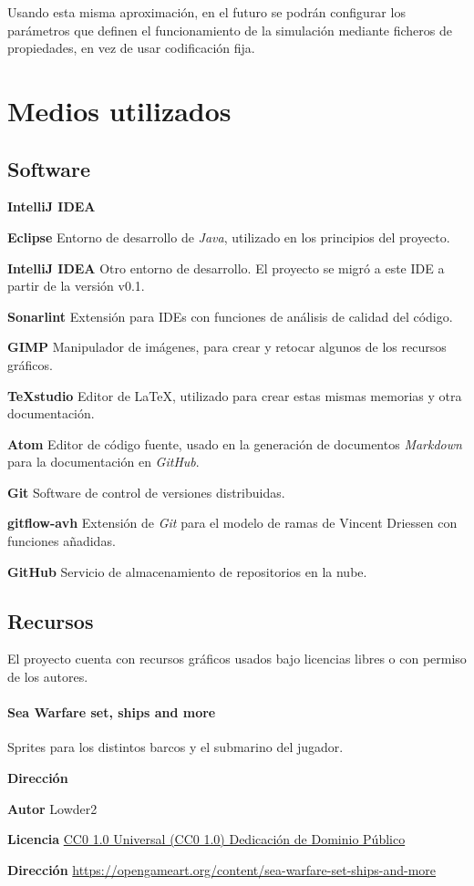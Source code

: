 \documentclass[a4paper,
	11pt,
	parskip=full,
	bibliography=totoc,
	twoside
	]{scrartcl}
\let\oldsection\section
\def\section{\cleardoubleoddpage\oldsection}
\begin{document}
		Usando esta misma aproximación, en el futuro se podrán configurar los parámetros que definen el funcionamiento de la simulación mediante ficheros de propiedades, en vez de usar codificación fija.
	
\section{Medios utilizados}
\label{sec:medios}
	\subsection{Software}
	\begin{labeling}{\textbf{IntelliJ IDEA}}
		\item[\textbf{Eclipse}] Entorno de desarrollo de \textit{Java}, utilizado en los principios del proyecto.
		\item[\textbf{IntelliJ IDEA}] Otro entorno de desarrollo. El proyecto se migró a este IDE a partir de la versión v0.1.
		\item[\textbf{Sonarlint}] Extensión para IDEs con funciones de análisis de calidad del código.
		\item[\textbf{GIMP}] Manipulador de imágenes, para crear y retocar algunos de los recursos gráficos.
		\item[\textbf{TeXstudio}] Editor de \LaTeX, utilizado para crear estas mismas memorias y otra documentación.
		\item[\textbf{Atom}] Editor de código fuente, usado en la generación de documentos \textit{Markdown} para la documentación en \textit{GitHub}.
		\item[\textbf{Git}] Software de control de versiones distribuidas.
		\item[\textbf{gitflow-avh}] Extensión de \textit{Git} para el modelo de ramas de Vincent Driessen con funciones añadidas.
		\item[\textbf{GitHub}] Servicio de almacenamiento de repositorios en la nube.
	\end{labeling}
	
	\subsection{Recursos}
	\label{subsec:recursos}
	El proyecto cuenta con recursos gráficos usados bajo licencias libres o con permiso de los autores.
	
	\paragraph{Sea Warfare set, ships and more}
		Sprites para los distintos barcos y el submarino del jugador.
		\begin{labeling}{\textbf{Dirección}}
			\item[\textbf{Autor}] Lowder2
			\item[\textbf{Licencia}] \href{https://creativecommons.org/publicdomain/zero/1.0/deed.es}{CC0 1.0 Universal (CC0 1.0)
				Dedicación de Dominio Público}
			\item[\textbf{Dirección}] \href{https://opengameart.org/content/sea-warfare-set-ships-and-more}{https://opengameart.org/content/sea-warfare-set-ships-and-more}
		\end{labeling}
	
\end{document}
